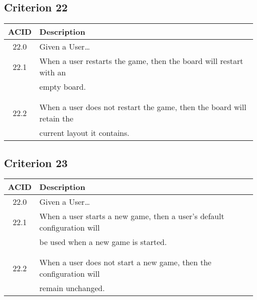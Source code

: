 \documentclass[11pt]{article}
\begin{document}
\subsection{Criterion 22}
\label{sec:orgb5a825d}
\begin{center}
\begin{tabular}{|c|p{12.0cm}|}
ACID & Description\\
\hline
22.0 & Given a User\ldots{}\\
\hline
22.1 & When a user restarts the game, then the board will restart with an\\
 & empty board.\\
 & \\
 & \\
22.2 & When a user does not restart the game, then the board will retain the\\
 & current layout it contains.\\
\end{tabular}
\end{center}

\subsection{Criterion 23}
\label{sec:org71191d3}
\begin{center}
\begin{tabular}{|c|p{12.0cm}|}
ACID & Description\\
\hline
22.0 & Given a User\ldots{}\\
\hline
22.1 & When a user starts a new game, then a user's default configuration will\\
 & be used when a new game is started.\\
 & \\
 & \\
22.2 & When a user does not start a new game, then the configuration will\\
 & remain unchanged.\\
\end{tabular}
\end{center}
\end{document}
